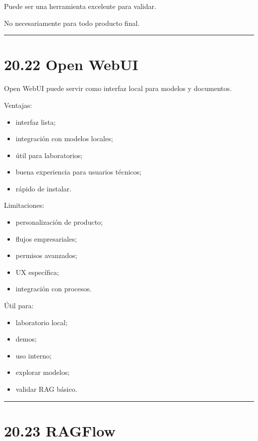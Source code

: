 Puede ser una herramienta excelente para validar.

No necesariamente para todo producto final.

\begin{center}\rule{0.5\linewidth}{0.5pt}\end{center}

\section{20.22 Open WebUI}\label{open-webui-1}

Open WebUI puede servir como interfaz local para modelos y documentos.

Ventajas:

\begin{itemize}
\tightlist
\item
  interfaz lista;
\item
  integración con modelos locales;
\item
  útil para laboratorios;
\item
  buena experiencia para usuarios técnicos;
\item
  rápido de instalar.
\end{itemize}

Limitaciones:

\begin{itemize}
\tightlist
\item
  personalización de producto;
\item
  flujos empresariales;
\item
  permisos avanzados;
\item
  UX específica;
\item
  integración con procesos.
\end{itemize}

Útil para:

\begin{itemize}
\tightlist
\item
  laboratorio local;
\item
  demos;
\item
  uso interno;
\item
  explorar modelos;
\item
  validar RAG básico.
\end{itemize}

\begin{center}\rule{0.5\linewidth}{0.5pt}\end{center}

\section{20.23 RAGFlow}\label{ragflow}

